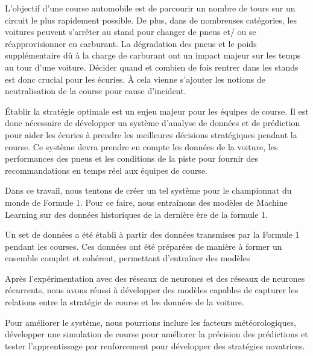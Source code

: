 L'objectif d'une course automobile est de parcourir un nombre de tours sur un circuit le plus
rapidement possible. De plus, dans de nombreuses catégories, les voitures peuvent s'arrêter au stand pour changer de pneus et/ ou se réapprovisionner en carburant.
La dégradation des pneus et le poids supplémentaire dû à la charge de carburant ont un impact majeur sur les temps au tour d'une voiture.
Décider quand et combien de fois rentrer dans les stands est donc crucial pour les écuries. À cela vienne s'ajouter les notions de neutralisation de la course pour cause d'incident.

Établir la stratégie optimale est un enjeu majeur pour les équipes de course. Il est donc nécessaire de développer un système d'analyse de données et de prédiction pour aider les écuries à prendre les meilleures décisions stratégiques pendant la course.
Ce système devra prendre en compte les données de la voiture, les performances des pneus et les conditions de la piste pour fournir des recommandations en temps réel aux équipes de course.

Dans ce travail, nous tentons de créer un tel système pour le championnat du monde de Formule 1.
Pour ce faire, nous entraînons des modèles de Machine Learning sur des données historiques de la dernière ère de la formule 1.

Un set de données a été établi à partir des données transmises par la Formule 1 pendant les courses.
Ces données ont été préparées de manière à former un ensemble complet et cohérent, permettant d'entraîner des modèles

Après l'expérimentation avec des réseaux de neurones et des réseaux de neurones récurrents,
nous avons réussi à développer des modèles capables de capturer les relations entre la stratégie de course et les données de la voiture.

Pour améliorer le système, nous pourrions inclure les facteurs météorologiques, développer une simulation de course pour améliorer la précision des prédictions
et tester l'apprentissage par renforcement pour développer des stratégies novatrices.